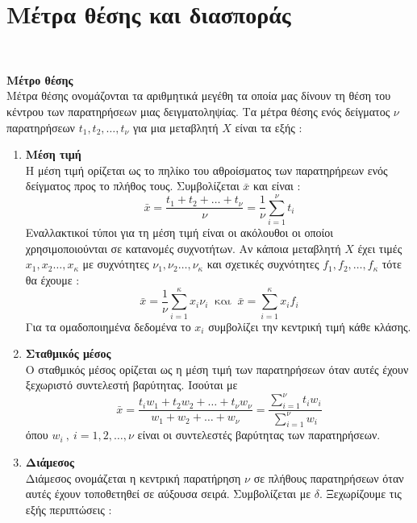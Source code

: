 \documentclass[twoside,nofonts,internet,math,spyros]{frontisthrio}
\begin{document}
\section{Μέτρα θέσης και διασποράς}\mbox{}\\
\orismoi
\begin{arithmisi}
\item\textbf{Μέτρο θέσης}\\
Μέτρα θέσης ονομάζονται τα αριθμητικά μεγέθη τα οποία μας δίνουν τη θέση του κέντρου των παρατηρήσεων μιας δειγματοληψίας. Τα μέτρα θέσης ενός δείγματος $ \nu $ παρατηρήσεων $ t_1,t_2,\ldots,t_\nu $ για μια μεταβλητή $ X $ είναι τα εξής :
\begin{enumerate}[label=\bf\arabic*.,itemsep=0mm]
\item \textbf{Μέση τιμή}\\
Η μέση τιμή ορίζεται ως το πηλίκο του αθροίσματος των παρατηρήρεων ενός δείγματος προς το πλήθος τους. Συμβολίζεται $ \bar{x} $ και είναι :
\[ \bar{x}=\frac{t_1+t_2+\ldots+t_\nu}{\nu}=\frac{1}{\nu}\sum_{i=1}^{\nu}{t_i} \]
Εναλλακτικοί τύποι για τη μέση τιμή είναι οι ακόλουθοι οι οποίοι χρησιμοποιούνται σε κατανομές συχνοτήτων. Αν κάποια μεταβλητή $ X $ έχει τιμές $ x_1,x_2\ldots,x_\kappa $ με συχνότητες $ \nu_1,\nu_2\ldots,\nu_\kappa $ και σχετικές συχνότητες $ f_1,f_2,\ldots,f_\kappa $ τότε θα έχουμε :
\[ \bar{x}=\frac{1}{\nu}\sum_{i=1}^{\kappa}{x_i\nu_i}\ \textrm{ και }\ \bar{x}=\sum_{i=1}^{\kappa}{x_if_i} \]
Για τα ομαδοποιημένα δεδομένα το $ x_i $ συμβολίζει την κεντρική τιμή κάθε κλάσης.
\item \textbf{Σταθμικός μέσος}\\
Ο σταθμικός μέσος ορίζεται ως η μέση τιμή των παρατηρήσεων όταν αυτές έχουν ξεχωριστό συντελεστή βαρύτητας. Ισούται με 
\[ \bar{x}=\frac{t_iw_1+t_2w_2+\ldots+t_\nu w_\nu}{w_1+w_2+\ldots+w_\nu}=\frac{\sum\limits_{i=1}^{\nu}{t_iw_i}}{\sum\limits_{i=1}^{\nu}{w_i}} \]
όπου $ w_i\ ,\ i=1,2,\ldots,\nu $ είναι οι συντελεστές βαρύτητας των παρατηρήσεων.
\item \textbf{Διάμεσος}\\
Διάμεσος ονομάζεται η κεντρική παρατήρηση $ \nu $ σε πλήθους παρατηρήσεων όταν αυτές έχουν τοποθετηθεί σε αύξουσα σειρά. Συμβολίζεται με $ \delta $. Ξεχωρίζουμε τις εξής περιπτώσεις :
\end{enumerate}
\end{arithmisi}
\end{document}
